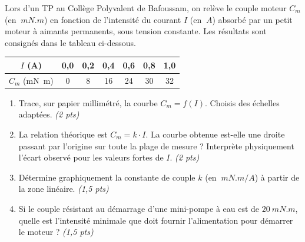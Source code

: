 \documentclass[11pt]{article}
\begin{document}
\begin{exercice}
Lors d'un TP au Collège Polyvalent de Bafoussam, on relève le couple moteur $C_m$ (en $\SI{}{mN.m}$) en fonction de l'intensité du courant $I$ (en $\SI{}{A}$) absorbé par un petit moteur à aimants permanents, sous tension constante. Les résultats sont consignés dans le tableau ci-dessous.

\begin{center}
\begin{tabular}{|c|c|c|c|c|c|c|}
\hline
$I$ (\si{\ampere}) & 0,0 & 0,2 & 0,4 & 0,6 & 0,8 & 1,0 \\
\hline
$C_m$ (\si{\milli\newton\meter}) & 0 & 8 & 16 & 24 & 30 & 32 \\
\hline
\end{tabular}
\end{center}

\begin{enumerate}
    \item Trace, sur papier millimétré, la courbe $C_m = f(I)$. Choisis des échelles adaptées. \textit{(2 pts)}
    \item La relation théorique est $C_m = k \cdot I$. La courbe obtenue est-elle une droite passant par l'origine sur toute la plage de mesure ? Interprète physiquement l'écart observé pour les valeurs fortes de $I$. \textit{(2 pts)}
    \item Détermine graphiquement la constante de couple $k$ (en $\SI{}{mN.m/A}$) à partir de la zone linéaire. \textit{(1,5 pts)}
    \item Si le couple résistant au démarrage d'une mini-pompe à eau est de $\SI{20}{mN.m}$, quelle est l'intensité minimale que doit fournir l'alimentation pour démarrer le moteur ? \textit{(1,5 pts)}
\end{enumerate}
\end{exercice}
\end{document}
